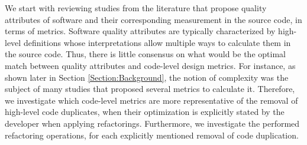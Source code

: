 





We start with reviewing studies from the literature that propose quality attributes of software and their corresponding measurement in the source code, in terms of metrics. Software quality attributes are typically characterized by high-level definitions whose interpretations allow multiple ways to calculate them in the source code. Thus, there is little consensus on what would be the optimal match between quality attributes and code-level design metrics. For instance, as shown later in Section \ref{Section:Background}, the notion of complexity was the subject of many studies that proposed several metrics to calculate it. Therefore, we investigate which code-level metrics are more representative of the removal of high-level code duplicates, when their optimization is explicitly stated by the developer when applying refactorings. Furthermore, we investigate the performed refactoring operations, for each explicitly mentioned removal of code duplication. 





